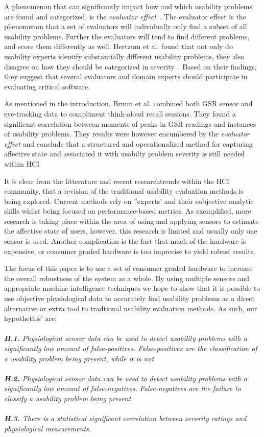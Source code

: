 A phenomenon that can significantly impact how and which usability problems are
found and categorized, is the \textit{evaluator effect}~\cite{eval_effect}.
The evaluator effect is the phenomenon that a set of evaluators will individually only find a subset of all usability problems.
Further the evaluators will tend to find different problems, and score them differently as well.\cite{eval_effect}
Hertzum et al. found that not only do
usability experts identify substantially different usability problems, they also
disagree on how they should be categorized in
severity~\cite{eval_effect_research}. Based on their findings, they suggest that
several evaluators and domain experts should participate in evaluating critical
software.

As mentioned in the introduction, Bruun et al. combined both GSR sensor and
eye-tracking data to compliment think-aloud recall sessions. They found a
significant correlation between moments of peaks in GSR readings and instances
of usability problems. They results were however encumbered by the
\textit{evaluator effect} and conclude that a structured and operationalized
method for capturing affective state and associated it with usabilty problem
severity is still needed within HCI

It is clear from the litterature and recent researchtrends within the HCI community, that a revision of the traditional usability evaluation methods is being explored. 
Current methods rely on ''experts' and their subjective analytic skills whilst being focused on performance-based metrics.
As exemplified, more research is taking place within the area of using and applying sensors to estimate the affective state of users, however, this research is limited and usually only one sensor is used. 
Another complication is the fact that much of the hardware is expensive, or consumer graded hardware is too imprecise to yield robust results.

The focus of this paper is to use a set of consumer graded hardware to increase the overall robustness of the system as a whole. 
By using multiple sensors and appropriate machine intelligence techniques we hope to show that it is possible to use objective physiological data to accurately find usability problems as a direct alternative or extra tool to tradtional usability evaluation methods. 
As such, our hypothethis' are:\\\\

\textit{\textbf{H.1.} Physiological sensor data can be used to detect usability problems with a significantly low amount of false-positives. False-positives are the classification of a usability problem being present, while it is not.}\\\\
\textit{\textbf{H.2.} Physiological sensor data can be used to detect usability problems with
 a significantly low amount of false-negatives. False-negatives are the failure to classify a usability problem being present}\\\\
\textit{\textbf{H.3.} There is a statistical significant correlation between severity ratings and physiological measurements.}

